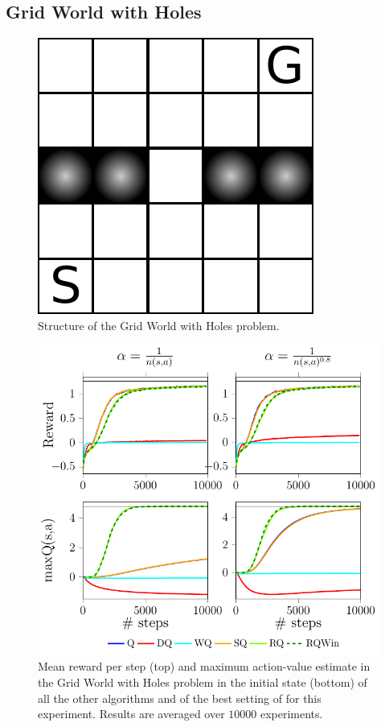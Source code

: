 \documentclass[conference]{IEEEtran}
\begin{document}
\subsection{Grid World with Holes}
\begin{figure}[t]
\centering
\includegraphics[scale=.55]{./imgs/gridHole/gridhole.pdf}
\caption{Structure of the Grid World with Holes problem.}
  \label{F:grid_hole_map}
\end{figure}
\begin{figure}[t]
\begin{minipage}{\columnwidth}
\centering
  \includegraphics[scale=.7]{./imgs/gridHole/grid_hole.pdf}
\end{minipage}
  \caption{Mean reward per step (top) and maximum action-value estimate in the Grid World with Holes problem in the initial state (bottom) of all the other algorithms and of the best setting of \alg for this experiment. Results are averaged over $10000$ experiments.}
  \label{F:hole}
\end{figure}
\end{document}

